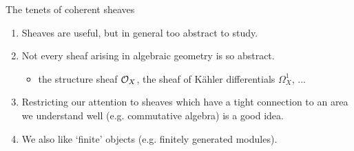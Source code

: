 \documentclass[
  xcolor=dvipsnames,
  aspectratio=169,
  compress
]{beamer}
\begin{document}
\begin{frame}{The tenets of coherent sheaves}
  \begin{enumerate}
    \item
      Sheaves are useful, but in general too abstract to study.

      \pause
    \item
      Not every sheaf arising in algebraic geometry is so abstract.
      \begin{itemize}
        \item
          the \alert{structure sheaf} $\mathcal{O}_{{X}}$, the \alert{sheaf of K\"{a}hler differentials} $\Omega^1_{X}$, ...
      \end{itemize}

      \pause
    \item
      Restricting our attention to sheaves which have a tight connection to an area we understand well (e.g. \alert{commutative algebra}) is a good idea.

      \pause
    \item
      We also like `finite' objects (e.g. \alert{finitely generated modules}).
  \end{enumerate}
\end{frame}

\iffalse
\begin{frame}{Making things formally invertible}
  \begin{definition}
    The \alert{localisation} of a ring $R$ at some element $f \in R$ is the ring of formal fractions
    \[
      R_f = \left\{
        \frac{r}{f^i}: r \in R,\, i \in \zpos
      \right\}.
    \]
    \pause
    Given an $R$-module $M$, the \alert{localisation} of $M$ at $f$ is the $R_f$-module
    \[
      M_f = \left\{
        \frac{m}{f^i}: m \in M,\, i \in \zpos
      \right\}.
    \]
    \pause
    Equality of fractions is what you expect.\footnote{...if you ignore torsion.}
  \end{definition}
\end{frame}
\fi
\end{document}
